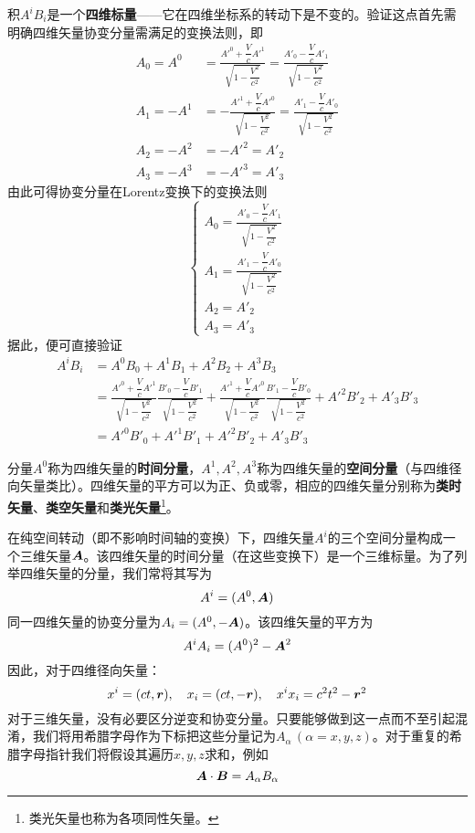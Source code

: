 积$A^iB_i$是一个{\bf 四维标量}——它在四维坐标系的转动下是不变的。验证这点首先需明确四维矢量协变分量需满足的变换法则，即
\begin{align*}
	A_0 = A^0 & = \frac{A'^0+\dfrac{V}{c}A'^1}{\sqrt{1-\dfrac{V^2}{c^2}}} = \frac{A'_0-\dfrac{V}{c}A'_1}{\sqrt{1-\dfrac{V^2}{c^2}}} \\
	A_1 = -A^1 & = -\frac{A'^1+\dfrac{V}{c}A'^0}{\sqrt{1-\dfrac{V^2}{c^2}}} = \frac{A'_1-\dfrac{V}{c}A'_0}{\sqrt{1-\dfrac{V^2}{c^2}}} \\
	A_2 = -A^2 & = -A'^2 = A'_2 \\
	A_3 = -A^3 & = -A'^3 = A'_3
\end{align*}
由此可得协变分量在Lorentz变换下的变换法则
\begin{equation}
\begin{cases}
	\displaystyle A_0 = \frac{A'_0-\dfrac{V}{c}A'_1}{\sqrt{1-\dfrac{V^2}{c^2}}} \\[1.5ex]
	\displaystyle A_1 = \frac{A'_1-\dfrac{V}{c}A'_0}{\sqrt{1-\dfrac{V^2}{c^2}}} \\[1.5ex]
	\displaystyle A_2 = A'_2 \\[1.5ex]
	\displaystyle A_3 = A'_3
\end{cases}
\end{equation}
据此，便可直接验证
\begin{align*}
	A^iB_i & = A^0B_0+A^1B_1+A^2B_2+A^3B_3 \\
	& = \frac{A'^0+\dfrac{V}{c}A'^1}{\sqrt{1-\dfrac{V^2}{c^2}}} \frac{B'_0-\dfrac{V}{c}B'_1}{\sqrt{1-\dfrac{V^2}{c^2}}} + \frac{A'^1+\dfrac{V}{c}A'^0}{\sqrt{1-\dfrac{V^2}{c^2}}} \frac{B'_1-\dfrac{V}{c}B'_0}{\sqrt{1-\dfrac{V^2}{c^2}}} + A'^2B'_2 + A'_3B'_3 \\
	& = A'^0B'_0+A'^1B'_1+A'^2B'_2+A'_3B'_3
\end{align*}

分量$A^0$称为四维矢量的{\bf 时间分量}，$A^1,A^2,A^3$称为四维矢量的{\bf 空间分量}（与四维径向矢量类比）。四维矢量的平方可以为正、负或零，相应的四维矢量分别称为{\bf 类时矢量}、{\bf 类空矢量}和{\bf 类光矢量}\footnote{类光矢量也称为各项同性矢量。}。

在纯空间转动（即不影响时间轴的变换）下，四维矢量$A^i$的三个空间分量构成一个三维矢量$\boldsymbol{A}$。该四维矢量的时间分量（在这些变换下）是一个三维标量。为了列举四维矢量的分量，我们常将其写为
\begin{equation*}
	A^i = (A^0,\boldsymbol{A})
\end{equation*}
同一四维矢量的协变分量为$A_i=(A^0,-\boldsymbol{A})$。该四维矢量的平方为
\begin{equation*}
	A^iA_i = (A^0)^2 - \boldsymbol{A}^2
\end{equation*}
因此，对于四维径向矢量：
\begin{equation*}
	x^i = (ct,\boldsymbol{r}),\quad x_i = (ct,-\boldsymbol{r}),\quad x^ix_i = c^2t^2- \boldsymbol{r}^2
\end{equation*}
对于三维矢量，没有必要区分逆变和协变分量。只要能够做到这一点而不至引起混淆，我们将用希腊字母作为下标把这些分量记为$A_\alpha\,(\alpha=x,y,z)$。对于重复的希腊字母指针我们将假设其遍历$x,y,z$求和，例如
\begin{equation*}
	\boldsymbol{A} \cdot \boldsymbol{B} = A_\alpha B_\alpha
\end{equation*}

